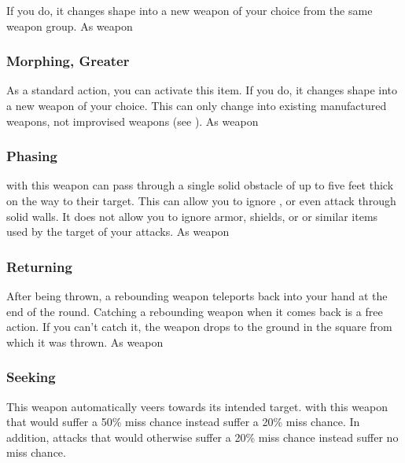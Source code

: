If you do, it changes shape into a new weapon of your choice from the same weapon group.
 
 As weapon
\lowercase{\hypertarget{item:Morphing, Greater}{}}\label{item:Morphing, Greater}
\hypertarget{item:Morphing, Greater}{\subsubsection{Morphing, Greater\hfill{}}}
As a standard action, you can activate this item.
If you do, it changes shape into a new weapon of your choice.
This can only change into existing manufactured weapons, not improvised weapons (see ).
 
 As weapon
\lowercase{\hypertarget{item:Phasing}{}}\label{item:Phasing}
\hypertarget{item:Phasing}{\subsubsection{Phasing\hfill{}}}
 with this weapon can pass through a single solid obstacle of up to five feet thick on the way to their target.
This can allow you to ignore , or even attack through solid walls.
It does not allow you to ignore armor, shields, or or similar items used by the target of your attacks.
 
 As weapon
\lowercase{\hypertarget{item:Returning}{}}\label{item:Returning}
\hypertarget{item:Returning}{\subsubsection{Returning\hfill{}}}
After being thrown, a rebounding weapon teleports back into your hand at the end of the round.
Catching a rebounding weapon when it comes back is a free action.
If you can't catch it, the weapon drops to the ground in the square from which it was thrown.
 
 As weapon
\lowercase{\hypertarget{item:Seeking}{}}\label{item:Seeking}
\hypertarget{item:Seeking}{\subsubsection{Seeking\hfill{}}}
This weapon automatically veers towards its intended target.
 with this weapon that would suffer a 50\% miss chance instead suffer a 20\% miss chance.
In addition, attacks that would otherwise suffer a 20\% miss chance instead suffer no miss chance.
